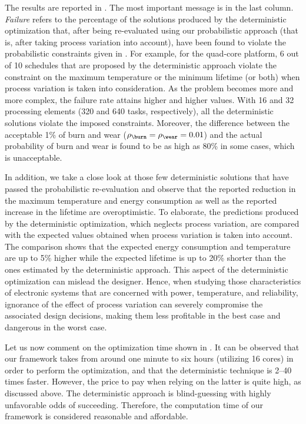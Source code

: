 The results are reported in . The most
important message is in the last column. \emph{Failure} refers to the percentage
of the solutions produced by the deterministic optimization that, after being
re-evaluated using our probabilistic approach (that is, after taking process
variation into account), have been found to violate the probabilistic
constraints given in . For example, for the
quad-core platform, 6 out of 10 schedules that are proposed by the deterministic
approach violate the constraint on the maximum temperature or the minimum
lifetime (or both) when process variation is taken into consideration. As the
problem becomes more and more complex, the failure rate attains higher and
higher values. With 16 and 32 processing elements (320 and 640 tasks,
respectively), all the deterministic solutions violate the imposed constraints.
Moreover, the difference between the acceptable 1\% of burn and wear
($\rho_\burn = \rho_\wear = 0.01$) and the actual probability of burn and wear
is found to be as high as 80\% in some cases, which is unacceptable.

In addition, we take a close look at those few deterministic solutions that have
passed the probabilistic re-evaluation and observe that the reported reduction
in the maximum temperature and energy consumption as well as the reported
increase in the lifetime are overoptimistic. To elaborate, the predictions
produced by the deterministic optimization, which neglects process variation,
are compared with the expected values obtained when process variation is taken
into account. The comparison shows that the expected energy consumption and
temperature are up to 5\% higher while the expected lifetime is up to 20\%
shorter than the ones estimated by the deterministic approach. This aspect of
the deterministic optimization can mislead the designer. Hence, when studying
those characteristics of electronic systems that are concerned with power,
temperature, and reliability, ignorance of the effect of process variation can
severely compromise the associated design decisions, making them less profitable
in the best case and dangerous in the worst case.

Let us now comment on the optimization time shown in
. It can be observed that our framework takes
from around one minute to six hours (utilizing 16 cores) in order to perform the
optimization, and that the deterministic technique is 2--40 times faster.
However, the price to pay when relying on the latter is quite high, as discussed
above. The deterministic approach is blind-guessing with highly unfavorable odds
of succeeding. Therefore, the computation time of our framework is considered
reasonable and affordable.

